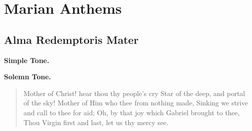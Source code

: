 \chapter{Marian Anthems}
{
\def\nogabcbreaks{T}
\newcommand{\printsimpletone}{
\vspace{0ex plus 0ex minus 2ex}
\needspace{3\baselineskip}
\begin{center}\textbf{Simple Tone.}\end{center}
\vspace{0ex plus 0ex minus 1ex}
}
\newcommand{\printsolemntone}{
\needspace{3\baselineskip}
\begin{center}\textbf{Solemn Tone.}\end{center}
\vspace{0ex plus 0ex minus 1ex}
}
\newcommand{\afterant}{
\ifx\note\undefined\else%
\textit{\note}

\medskip
\fi
\sloppy
\begin{columns}
\versicle{\vlatin}{\venglish}
\response{\rlatin}{\renglish}
\colchunk{}
\colplacechunks{}
\colchunk{\hspace*{3em}Orémus.}\colchunk{\hspace*{3em}Let us pray,}
\colplacechunks{}
\prayer{\prayerlatin}{\prayerenglish}
\end{columns}
\ifx\notetwo\undefined\else%
\bigskip

\needspace{5\baselineskip}
\textit{\notetwo}

\medskip
\begin{columns}
\versicle{\vlatintwo}{\venglishtwo}
\response{\rlatintwo}{\renglishtwo}
\colchunk{}
\colplacechunks{}
\colchunk{\hspace*{3em}Orémus.}\colchunk{\hspace*{3em}Let us pray,}
\colplacechunks{}
\prayer{\prayerlatintwo}{\prayerenglishtwo}
\end{columns}
\fi
}

\def\gabcfolder{../MarianAntiphons}

\section{Alma Redemptoris Mater}
\printsimpletone{}
\printsolemntone{}
\begin{quote}{Mother of Christ! hear thou thy people's cry
Star of the deep, and portal of the sky!
Mother of Him who thee from nothing made,
Sinking we strive and call to thee for aid;
Oh, by that joy which Gabriel brought to thee,
Thou Virgin first and last, let us thy mercy see.}\end{quote}

}
